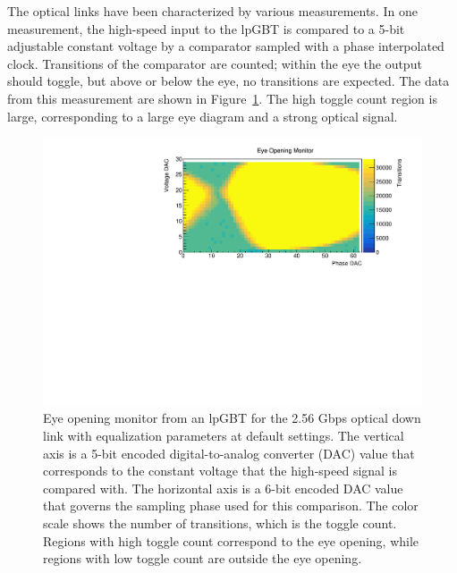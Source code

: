 \documentclass[a4paper,11pt]{article}
\newcommand{\fig}{Figure}
\begin{document}

The optical links have been characterized by various measurements.
In one measurement, the high-speed input to the lpGBT is compared to a 5-bit adjustable constant voltage by a comparator sampled with a phase interpolated clock.
Transitions of the comparator are counted; within the eye the output should toggle, but above or below the eye, no transitions are expected.
The data from this measurement are shown in \fig~\ref{fig:lpgbt_eye}.
The high toggle count region is large, corresponding to a large eye diagram and a strong optical signal.


\begin{figure}[htbp]
\centering
\includegraphics[width=1.0\textwidth,origin=c]{../figures/lpGBT_eye.pdf}
\caption{
\label{fig:lpgbt_eye}
Eye opening monitor from an lpGBT for the 2.56 Gbps optical down link with equalization parameters at default settings.
The vertical axis is a 5-bit encoded digital-to-analog converter (DAC) value that corresponds to the constant voltage that the high-speed signal is compared with.
The horizontal axis is a 6-bit encoded DAC value that governs the sampling phase used for this comparison.
The color scale shows the number of transitions, which is the toggle count.
Regions with high toggle count correspond to the eye opening, while regions with low toggle count are outside the eye opening.
}
\end{figure}

\end{document}
